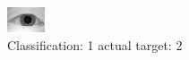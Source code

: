 \begin{figure}[h!]
\begin{center}
\includegraphics[width=0.60\columnwidth]{figures/ID878_class_1_target_2.png}
\end{center}
\caption{ Classification: 1 actual target: 2}
\label{fig:ID878_class_1_target_2}
\end{figure}
